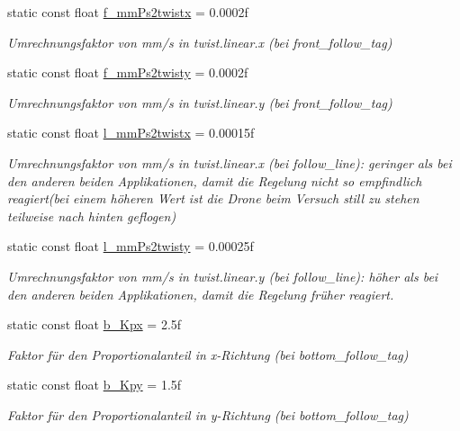 \begin{DoxyCompactItemize}
static const float \hyperlink{class_cglobal_a4f723543ed33fd4a3130199a6a49f8de}{f\_\-mmPs2twistx} = 0.0002f
\begin{DoxyCompactList}\small\item\em Umrechnungsfaktor von mm/s in twist.linear.x (bei front\_\-follow\_\-tag) \end{DoxyCompactList}\item 
static const float \hyperlink{class_cglobal_abeca26e674667f54df37cec645067854}{f\_\-mmPs2twisty} = 0.0002f
\begin{DoxyCompactList}\small\item\em Umrechnungsfaktor von mm/s in twist.linear.y (bei front\_\-follow\_\-tag) \end{DoxyCompactList}\item 
static const float \hyperlink{class_cglobal_a7440e55e4a63e1c926c582a36a4d6bd7}{l\_\-mmPs2twistx} = 0.00015f
\begin{DoxyCompactList}\small\item\em Umrechnungsfaktor von mm/s in twist.linear.x (bei follow\_\-line): geringer als bei den anderen beiden Applikationen, damit die Regelung nicht so empfindlich reagiert(bei einem höheren Wert ist die Drone beim Versuch still zu stehen teilweise nach hinten geflogen) \end{DoxyCompactList}\item 
static const float \hyperlink{class_cglobal_af8f19427d5da8e6c88098b61e8676786}{l\_\-mmPs2twisty} = 0.00025f
\begin{DoxyCompactList}\small\item\em Umrechnungsfaktor von mm/s in twist.linear.y (bei follow\_\-line): höher als bei den anderen beiden Applikationen, damit die Regelung früher reagiert. \end{DoxyCompactList}\item 
static const float \hyperlink{class_cglobal_ac4453024370993d15408d4a3235e95e8}{b\_\-Kpx} = 2.5f
\begin{DoxyCompactList}\small\item\em Faktor für den Proportionalanteil in x-\/Richtung (bei bottom\_\-follow\_\-tag) \end{DoxyCompactList}\item 
static const float \hyperlink{class_cglobal_aecfc05f716f9c1445fd10ad436972a9d}{b\_\-Kpy} = 1.5f
\begin{DoxyCompactList}\small\item\em Faktor für den Proportionalanteil in y-\/Richtung (bei bottom\_\-follow\_\-tag) \end{DoxyCompactList}\item 

\end{DoxyCompactItemize}
